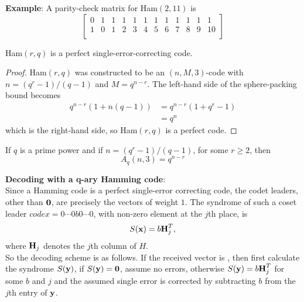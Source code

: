 \documentclass[../main.tex]{subfiles}
\begin{document}
\textbf{Example}: A parity-check matrix for Ham$(2,11)$ is
\[	
	\left[
	\begin{array}{cccccccccccc}
		0 & 1 & 1 & 1 & 1 & 1 & 1 & 1 & 1 & 1 & 1 & 1  \\
		1 & 0 & 1 & 2 & 3 & 4 & 5 & 6 & 7 & 8 & 9 & 10 \\
	\end{array}
	\right]
\]

\begin{thm}
	Ham$(r,q)$ is a perfect single-error-correcting code.
\end{thm}
\begin{proof}
	Ham$(r,q)$ was constructed to be an $(n,M,3)$-code with $n=(q^r-1)/(q-1)$ and $M=q^{n-r}$. The left-hand side of the sphere-packing bound becomes 
	\begin{align}
		q^{n-r}(1 + n(q-1)) &= q^{n-r}(1 + q^r -1)\\
		&= q^n
	\end{align}
	which is the right-hand side, so Ham$(r,q)$ is a perfect code.	 
\end{proof}

\begin{cor}
	If $q$ is a prime power and if $n=(q^r-1)/(q-1)$, for some $r \geq 2$, then
	\[
		A_q(n,3) = q^{n-r}
	\]
\end{cor}
\vspace{2mm}

\textbf{Decoding with a q-ary Hamming code}:\\
Since a Hamming code is a perfect single-error correcting code, the codet leaders, other than $\textbf{0}$, are precisely the vectors of weight $1$. The syndrome of such a coset leader $code{x} = 0\cdots 0b0\cdots 0$, with non-zero element at the $j$th place, is
\[
	S(\textbf{x}) = b\textbf{H}_j^T,
\]
where $\textbf{H}_j$ denotes the $j$th column of $H$.\\
So the decoding scheme is as follows. If the received vector is , then first calculate the syndrome $S(\textbf{y})$, if $S(\textbf{y})=\textbf{0}$, assume no errors, otherwise $S(\textbf{y}) = b\textbf{H}_j^T$ for some $b$ and $j$ and the assumed single error is corrected by subtracting $b$ from the $j$th entry of $\textbf{y}$.
\end{document}
